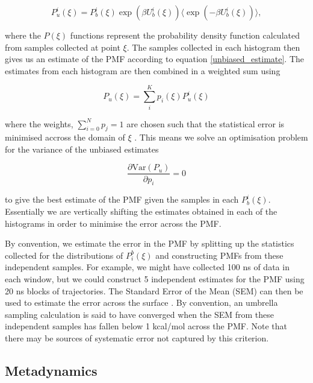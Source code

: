 \begin{equation}
	P_u^i(\xi) = P_b^i(\xi) \exp(\beta U_{b}^i (\xi)) \langle \exp(-\beta U_b^i (\xi))\rangle,
\end{equation}

where the $P(\xi)$  functions represent the probability density function calculated from samples collected at point $\xi$. The samples collected in each histogram then gives us an estimate of the PMF according to equation \ref{unbiased_estimate}. The estimates from each histogram are then combined in a weighted sum using

\begin{equation}
	P_u(\xi) = \sum_i^K p_i(\xi)P_u^i (\xi)
\end{equation}

where the weights, $\sum_{i=0}^N p_j = 1$ are chosen such that the statistical error is minimised accross the domain of $\xi$ \cite{chen2011}. This means we solve an optimisation problem for the variance of the unbiased estimates

\begin{equation}
	\frac{\partial\text{Var} (P_u)}{\partial p_i} = 0
\end{equation}

to give the best estimate of the PMF given the samples in each $P_b^i(\xi)$. Essentially we are vertically shifting the estimates obtained in each of the histograms in order to minimise the error across the PMF. 

By convention, we estimate the error in the PMF by splitting up the statistics collected for the distributions of $P^b_i (\xi)$ and constructing PMFs from these independent samples. For example, we might have collected 100 ns of data in each window, but we could construct 5 independent estimates for the PMF using 20 ns blocks of trajectories. The Standard Error of the Mean (SEM) can then be used to estimate the error across the surface \cite{gapsys2020}. By convention, an umbrella sampling calculation is said to have converged when the SEM from these independent samples has fallen below 1 kcal/mol across the PMF. Note that there may be sources of systematic error not captured by this criterion. 

\subsection{Metadynamics}

